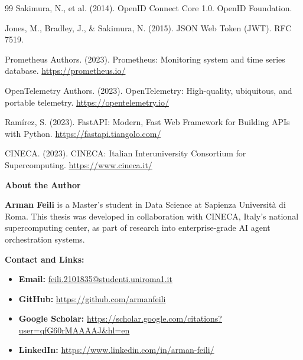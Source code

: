 \documentclass[a4paper,twoside]{sapthesis}
\begin{document}
\begin{thebibliography}{99}
Sakimura, N., et al. (2014). OpenID Connect Core 1.0. OpenID Foundation.

Jones, M., Bradley, J., \& Sakimura, N. (2015). JSON Web Token (JWT). RFC 7519.

Prometheus Authors. (2023). Prometheus: Monitoring system and time series database. \url{https://prometheus.io/}

OpenTelemetry Authors. (2023). OpenTelemetry: High-quality, ubiquitous, and portable telemetry. \url{https://opentelemetry.io/}

Ram{\'i}rez, S. (2023). FastAPI: Modern, Fast Web Framework for Building APIs with Python. \url{https://fastapi.tiangolo.com/}

CINECA. (2023). CINECA: Italian Interuniversity Consortium for Supercomputing. \url{https://www.cineca.it/}


\end{thebibliography}


\clearpage
\thispagestyle{empty}
\vspace*{\fill}

\begin{center}
\textbf{\Large About the Author}
\end{center}

\vspace{1cm}

\noindent
\textbf{Arman Feili} is a Master's student in Data Science at Sapienza Università di Roma. 
This thesis was developed in collaboration with CINECA, Italy's national supercomputing center, 
as part of research into enterprise-grade AI agent orchestration systems.

\vspace{1cm}

\noindent
\textbf{Contact and Links:}
\begin{itemize}
    \item \textbf{Email:} \href{mailto:feili.2101835@studenti.uniroma1.it}{feili.2101835@studenti.uniroma1.it}
    \item \textbf{GitHub:} \url{https://github.com/armanfeili}
    \item \textbf{Google Scholar:} \url{https://scholar.google.com/citations?user=qfG60rMAAAAJ&hl=en}
    \item \textbf{LinkedIn:} \url{https://www.linkedin.com/in/arman-feili/}
\end{itemize}
\end{document}
